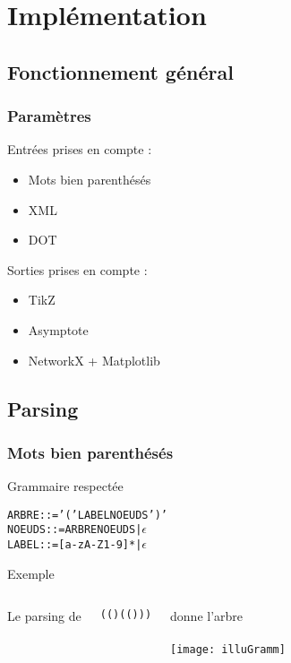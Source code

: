 \section{Implémentation}

\subsection{Fonctionnement général}

\begin{frame}
    \frametitle{Paramètres}
    Entrées prises en compte :
    \begin{itemize}
        \item Mots bien parenthésés
        \item XML
        \item DOT %
    \end{itemize}
    Sorties prises en compte :
    \begin{itemize}
        \item TikZ %
        \item Asymptote %
        \item NetworkX + Matplotlib %
    \end{itemize}
\end{frame}

\subsection{Parsing}

\begin{frame}[fragile]
    \frametitle{Mots bien parenthésés}
    \begin{block}{Grammaire respectée}
    \begin{alltt}
        ARBRE ::= '(' LABEL NOEUDS ')'
        NOEUDS ::= ARBRE NOEUDS | \(\epsilon\)
        LABEL ::= [a-zA-Z1-9]* | \(\epsilon\)
    \end{alltt}
    \end{block}
    \begin{exampleblock}{Exemple}
    \begin{columns}[t]
		Le parsing de \\
		\centering
	    \begin{alltt}
	    (()(()))
	    \end{alltt}
		donne l'arbre\\
		~\\
		\texttt{[image: illuGramm]}
		\end{columns}
    \end{exampleblock}
\end{frame}

